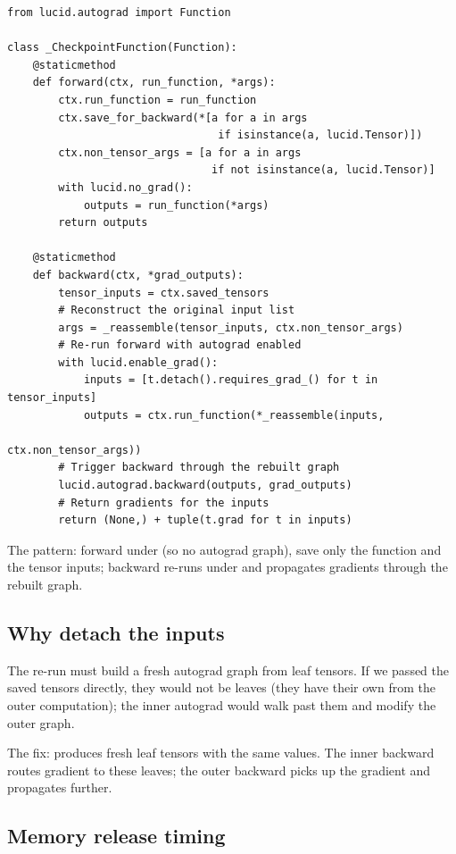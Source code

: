 \begin{lstlisting}[style=lucid,language=LucidPython]
from lucid.autograd import Function

class _CheckpointFunction(Function):
    @staticmethod
    def forward(ctx, run_function, *args):
        ctx.run_function = run_function
        ctx.save_for_backward(*[a for a in args
                                 if isinstance(a, lucid.Tensor)])
        ctx.non_tensor_args = [a for a in args
                                if not isinstance(a, lucid.Tensor)]
        with lucid.no_grad():
            outputs = run_function(*args)
        return outputs

    @staticmethod
    def backward(ctx, *grad_outputs):
        tensor_inputs = ctx.saved_tensors
        # Reconstruct the original input list
        args = _reassemble(tensor_inputs, ctx.non_tensor_args)
        # Re-run forward with autograd enabled
        with lucid.enable_grad():
            inputs = [t.detach().requires_grad_() for t in tensor_inputs]
            outputs = ctx.run_function(*_reassemble(inputs,
                                                    ctx.non_tensor_args))
        # Trigger backward through the rebuilt graph
        lucid.autograd.backward(outputs, grad_outputs)
        # Return gradients for the inputs
        return (None,) + tuple(t.grad for t in inputs)
\end{lstlisting}

The pattern: forward under  (so no autograd graph),
save only the function and the tensor inputs; backward re-runs
under  and propagates gradients through the
rebuilt graph.

\subsection{Why detach the inputs}
\label{ssec:gradient_checkpointing:detach}

The re-run  must build a fresh autograd graph
from leaf tensors. If we passed the saved tensors directly, they
would not be leaves (they have their own  from the
outer computation); the inner autograd would walk past them and
modify the outer graph.

The fix:  produces fresh leaf
tensors with the same values. The inner backward routes gradient
to these leaves; the outer backward picks up the gradient and
propagates further.

\subsection{Memory release timing}
\label{ssec:gradient_checkpointing:release}

